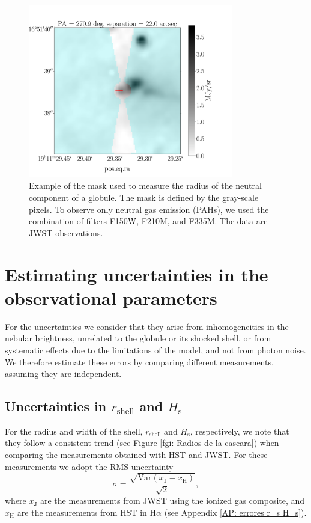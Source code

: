 \documentclass{book}
\begin{document}
\begin{figure}[htb]
  \centering
  \includegraphics[width=0.8\textwidth]{Nuevas imagenes finales/r_0_.pdf}
  \caption{Example of the mask used to measure the radius of the
    neutral component of a globule. The mask is defined by the
    gray-scale pixels. To observe only neutral gas emission (PAHs),
    we used the combination of filters F150W, F210M, and F335M. The
    data are JWST observations.}
  \label{Medicion de r_0}
\end{figure}
  
\section[Observational errors]{Estimating uncertainties in the observational parameters}

For the uncertainties we consider that they arise from inhomogeneities
in the nebular brightness, unrelated to the globule or its shocked
shell, or from systematic effects due to the limitations of the model,
and not from photon noise. We therefore estimate these errors by
comparing different measurements, assuming they are independent.

\subsection{\boldmath Uncertainties in $r_\mathrm{shell}$ and $H_\mathrm{s}$}
\label{sec:error-shell}

For the radius and width of the shell, $r_\mathrm{shell}$ and
$H_\mathrm{s}$, respectively, we note that they follow a consistent
trend (see Figure \ref{fgi: Radios de la cascara}) when comparing the
measurements obtained with HST and JWST. For these measurements we
adopt the RMS uncertainty
\begin{equation}
    \sigma=\frac{\sqrt{\mathrm{Var}(x_\mathrm{J}-x_\mathrm{H})}}{\sqrt{2}},
\end{equation}
where $x_\mathrm{J}$ are the measurements from JWST using the ionized
gas composite, and $x_\mathrm{H}$ are the measurements from HST in
H$\alpha$ (see Appendix \ref{AP: errores r_s H_s}).
\end{document}
